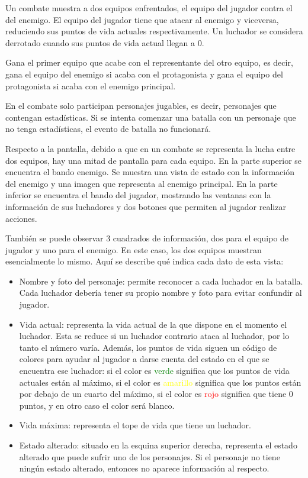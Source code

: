 Un combate muestra a dos equipos enfrentados, el equipo del jugador contra el del enemigo. El equipo del jugador tiene que atacar al enemigo y viceversa, reduciendo sus puntos de vida actuales respectivamente. Un luchador se considera derrotado cuando sus puntos de vida actual llegan a 0.

Gana el primer equipo que acabe con el representante del otro equipo, es decir, gana el equipo del enemigo si acaba con el protagonista y gana el equipo del protagonista si acaba con el enemigo principal.

En el combate solo participan personajes jugables, es decir, personajes que contengan estadísticas. Si se intenta comenzar una batalla con un personaje que no tenga estadísticas, el evento de batalla no funcionará.

Respecto a la pantalla, debido a que en un combate se representa la lucha entre dos equipos, hay una mitad de pantalla para cada equipo.
En la parte superior se encuentra el bando enemigo. Se muestra una vista de estado con la información del enemigo y una imagen que representa al enemigo principal.
En la parte inferior se encuentra el bando del jugador, mostrando las ventanas con la información de sus luchadores y dos botones que permiten al jugador realizar acciones.

También se puede observar 3 cuadrados de información, dos para el equipo de jugador y uno para el enemigo. En este caso, los dos equipos muestran esencialmente lo mismo. Aquí se describe qué indica cada dato de esta vista:
\begin{itemize}
	\item Nombre y foto del personaje: permite reconocer a cada luchador en la batalla. Cada luchador debería tener su propio nombre y foto para evitar confundir al jugador.
	\item Vida actual: representa la vida actual de la que dispone en el momento el luchador. Esta se reduce si un luchador contrario ataca al luchador, por lo tanto el número varía.
	Además, los puntos de vida siguen un código de colores para ayudar al jugador a darse cuenta del estado en el que se encuentra ese luchador: si el color es \textcolor{green}{verde} significa que los puntos de vida actuales están al máximo, si el color es \textcolor{yellow}{amarillo} significa que los puntos están por debajo de un cuarto del máximo, si el color es  \textcolor{red}{rojo} significa que tiene 0 puntos, y en otro caso el color será blanco.
	\item Vida máxima: representa el tope de vida que tiene un luchador.
	\item Estado alterado: situado en la esquina superior derecha, representa el estado alterado que puede sufrir uno de los personajes. Si el personaje no tiene ningún estado alterado, entonces no aparece información al respecto.
\end{itemize}

